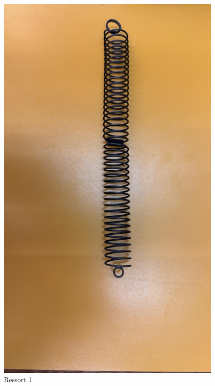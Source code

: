             \newpage

            \begin{figure}[h]
                \centering
                \begin{minipage}{0.31\textwidth}
                    \centering
                    \includegraphics[width=0.77\linewidth]{images/res2.jpeg}
                    \caption{Ressort 1}
                \end{minipage}
                \hfill
                \begin{minipage}{0.32\textwidth}
                    \centering

\end{minipage}
\end{figure}
